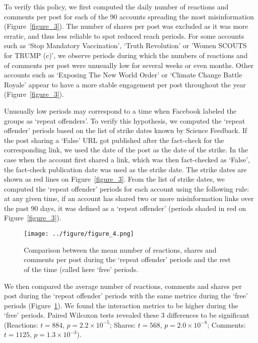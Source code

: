 \documentclass[sigconf]{acmart}
\begin{document}
To verify this policy, we first computed the daily number of reactions and comments per post for each of the 90 accounts spreading the most misinformation (Figure~\ref{figure_3}). The number of shares per post was excluded as it was more erratic, and thus less reliable to spot reduced reach periods. For some accounts such as `Stop Mandatory Vaccination', `Truth Revolution' or 'Women SCOUTS for TRUMP (c)', we observe periods during which the numbers of reactions and of comments per post were unusually low for several weeks or even months. Other accounts such as `Exposing The New World Order' or `Climate Change Battle Royale' appear to have a more stable engagement per post throughout the year (Figure~\ref{figure_3}).

Unusually low periods may correspond to a time when Facebook labeled the groups as `repeat offenders'. To verify this hypothesis, we computed the `repeat offender' periods based on the list of strike dates known by Science Feedback. If the post sharing a `False' URL got published after the fact-check for the corresponding link, we used the date of the post as the date of the strike. In the case when the account first shared a link, which was then fact-checked as `False', the fact-check publication date was used as the strike date. The strike dates are shown as red lines on Figure~\ref{figure_3}. From the list of strike dates, we computed the `repeat offender' periods for each account using the following rule: at any given time, if an account has shared two or more misinformation links over the past 90 days, it was defined as a `repeat offender' (periods shaded in red on Figure~\ref{figure_3}).

\begin{figure}[h]
  \centering
  \texttt{[image: ../figure/figure\_4.png]}
  \caption{Comparison between the mean number of reactions, shares and comments per post during the `repeat offender' periods and the rest of the time (called here `free' periods.}
  \label{figure_4}
\end{figure}

We then compared the average number of reactions, comments and shares per post during the `repeat offender' periods with the same metrics during the `free' periods (Figure~\ref{figure_4}). We found the interaction metrics to be higher during the `free' periods. Paired Wilcoxon tests revealed these 3 differences to be significant (Reactions: $t=884$, $p=2.2 \times 10^{-5}$; Shares: $t=568$, $p=2.0 \times 10^{-8}$; Comments: $t=1125$, $p=1.3 \times 10^{-3}$).
\end{document}

